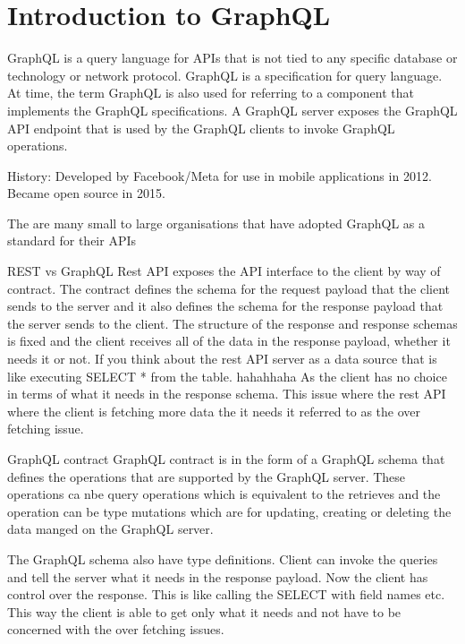 
\section{Introduction to GraphQL}

GraphQL is a query language for APIs that is not tied to any specific database or technology or network protocol.
GraphQL is a specification for query language.
At time, the term GraphQL is also used for referring to a component that implements the GraphQL specifications.
A GraphQL server exposes the GraphQL API endpoint that is used by the GraphQL clients to invoke GraphQL operations.

History: Developed by Facebook/Meta for use in mobile applications in 2012. Became open source in 2015.

The are many small  to large organisations that have adopted GraphQL as a standard for their APIs

REST vs GraphQL
Rest API exposes the API interface to the client by way of contract.
The contract defines the schema for the request payload that the client sends to the server and it also defines the schema for the response payload that the server sends to the client.
The structure of the response and response schemas is fixed and the client receives all of the data in  the response payload, whether it needs it or not.
If you think about the rest API server as a data source that is like executing SELECT * from the table. hahahhaha
As the client has no choice in terms of what it needs in the response schema.
This issue where the rest API where the client is fetching more data the it needs it referred to as the over fetching issue.

GraphQL contract
GraphQL contract is in the form of a GraphQL schema that defines the operations that are supported by the GraphQL server.
These operations ca nbe query operations which is equivalent to the retrieves and the operation can be type mutations which are for updating, creating or deleting the data manged on the GraphQL server.

The GraphQL schema also have type definitions.
Client can invoke the queries and tell the server what it needs in the response payload.
Now the client has control over the response.
This is like calling the SELECT with field names etc.
This way the client is able to get only what it needs and not have to be concerned with the over fetching issues.

